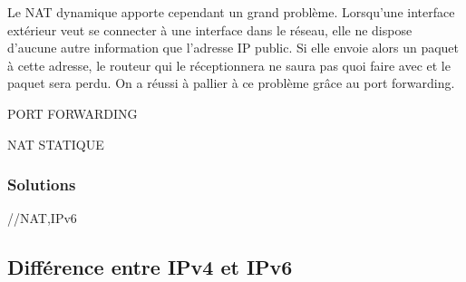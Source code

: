 Le NAT dynamique apporte cependant un grand problème. Lorsqu'une interface
extérieur veut se connecter à une interface dans le réseau, elle ne dispose
d'aucune autre information que l'adresse IP public. Si elle envoie alors un
paquet à cette adresse, le routeur qui le réceptionnera ne saura pas quoi faire
avec et le paquet sera perdu.  On a réussi à pallier à ce problème grâce au
port forwarding. 

PORT FORWARDING

NAT STATIQUE


\subsubsection{Solutions}
//NAT,IPv6
\subsection{Différence entre IPv4 et IPv6}
